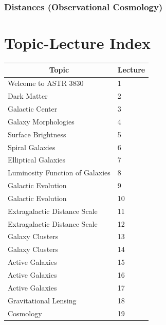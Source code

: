 \documentclass{book}
\begin{document}
\subsection{Distances (Observational Cosmology)}

\backmatter
\chapter{Topic-Lecture Index}
\begin{table}[H]
    \centering
    \begin{tabular}{|ll|}
        \hline
        \multicolumn{1}{|c}{Topic}      & Lecture \\ \hline \hline
        Welcome to ASTR 3830            & 1       \\ \hline
        Dark Matter                     & 2       \\ \hline
        Galactic Center                 & 3       \\ \hline
        Galaxy Morphologies             & 4       \\ \hline
        Surface Brightness              & 5       \\ \hline
        Spiral Galaxies                 & 6       \\ \hline
        Elliptical Galaxies             & 7       \\ \hline
        Luminosity Function of Galaxies & 8       \\ \hline
        Galactic Evolution              & 9       \\ \hline
        Galactic Evolution              & 10      \\ \hline
        Extragalactic Distance Scale    & 11      \\ \hline
        Extragalactic Distance Scale    & 12      \\ \hline
        Galaxy Clusters                 & 13      \\ \hline
        Galaxy Clusters                 & 14      \\ \hline
        Active Galaxies                 & 15      \\ \hline
        Active Galaxies                 & 16      \\ \hline
        Active Galaxies                 & 17      \\ \hline
        Gravitational Lensing           & 18      \\ \hline
        Cosmology                       & 19      \\ \hline

\end{tabular}
\end{table}
\end{document}
